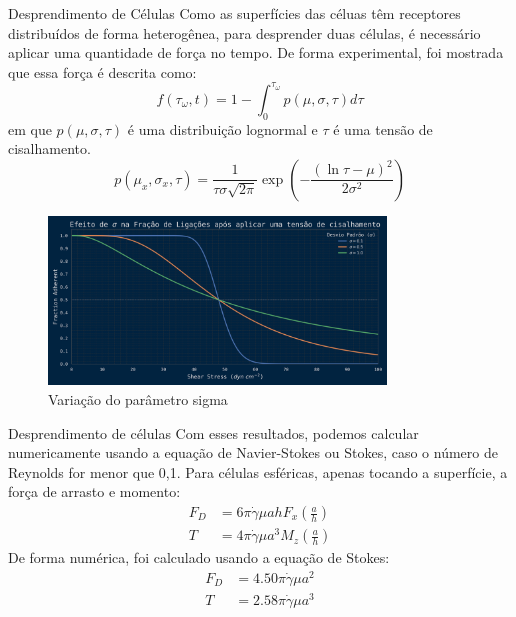 \documentclass[aspectratio=169]{beamer}
\begin{document}
\begin{frame}{Desprendimento de Células}
    Como as superfícies das céluas têm receptores distribuídos de forma heterogênea, para desprender
    duas células, é necessário aplicar uma quantidade de força no tempo. De forma experimental, foi mostrada
    que essa força é descrita como:
    \begin{equation}
        f(\tau_{\omega}, t) = 1 - \int_0^{\tau_{\omega}} p(\mu, \sigma, \tau) d\tau
    \end{equation}
    em que $p(\mu, \sigma, \tau)$ é uma distribuição lognormal e $\tau$ é uma tensão de cisalhamento.
    \begin{equation}
        p(\mu_{x}, \sigma_{x}, \tau) = \frac{1}{\tau \sigma \sqrt{2 \pi}} \exp \left( - \frac{(\ln \tau - \mu)^{2}}{2 \sigma^{2}} \right)
    \end{equation}
\end{frame}

\begin{frame}
    \begin{figure}
        \includegraphics[width=0.8\textwidth]{img/sigma_cisalhamento.png}
        \caption{Variação do parâmetro sigma}
    \end{figure}
\end{frame}

\begin{frame}{Desprendimento de células}
    Com esses resultados, podemos calcular numericamente usando a equação de Navier-Stokes ou Stokes, caso o número de Reynolds for menor que 0,1.
    Para células esféricas, apenas tocando a superfície, a força de arrasto e momento:
    \begin{align}
        F_D &= 6 \pi \dot{\gamma} \mu a h F_{x}\left(\frac{a}{h}\right) \\
        T &= 4 \pi \dot{\gamma} \mu a^{3} M_{z} \left(\frac{a}{h}\right)
    \end{align}
    De forma numérica, foi calculado usando a equação de Stokes:
    \begin{align}
        F_D &= 4.50 \pi \dot{\gamma} \mu a^{2} \\
        T &= 2.58 \pi \dot{\gamma} \mu a^{3}    
    \end{align}
\end{frame}
\end{document}
